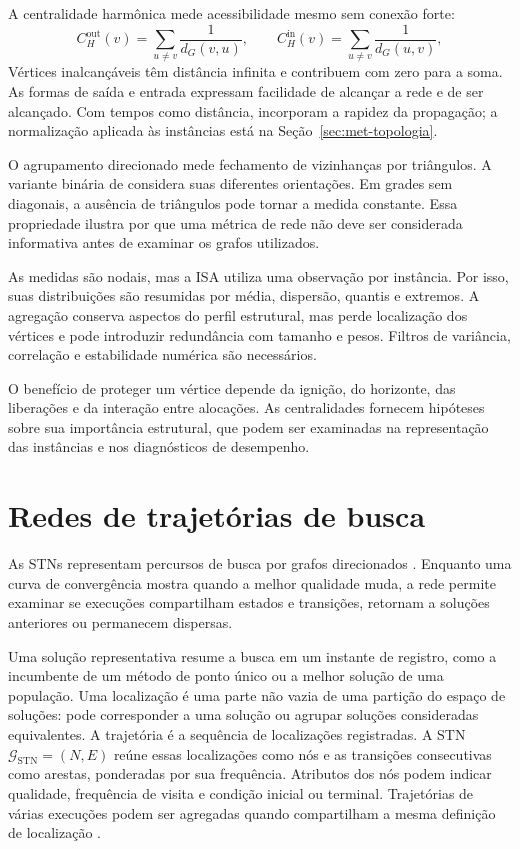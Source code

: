 A centralidade harmônica mede acessibilidade mesmo sem conexão forte:
\begin{equation}
 C_H^{\mathrm{out}}(v)=\sum_{u\neq v}\frac{1}{d_G(v,u)},\qquad
 C_H^{\mathrm{in}}(v)=\sum_{u\neq v}\frac{1}{d_G(u,v)},
 \label{eq:centralidade-harmonica}
\end{equation}
\noindent Vértices inalcançáveis têm distância infinita e contribuem
com zero para a soma. As formas de saída e entrada expressam
facilidade de alcançar a rede e de ser alcançado. Com tempos como distância,
incorporam a rapidez da propagação; a normalização aplicada às instâncias
está na Seção~\ref{sec:met-topologia}.

O agrupamento direcionado mede fechamento de vizinhanças por triângulos.
A variante binária de  considera suas diferentes
orientações. Em grades sem diagonais, a ausência de triângulos pode tornar
a medida constante. Essa propriedade ilustra por que uma métrica de rede
não deve ser considerada informativa antes de examinar os grafos utilizados.

As medidas são nodais, mas a ISA utiliza uma observação por instância.
Por isso, suas distribuições são resumidas por média, dispersão, quantis e
extremos. A agregação conserva aspectos do perfil estrutural, mas perde
localização dos vértices e pode introduzir redundância com tamanho e pesos.
Filtros de variância, correlação e estabilidade numérica são necessários.

O benefício de proteger um vértice depende da ignição, do horizonte, das
liberações e da interação entre alocações. As centralidades fornecem
hipóteses sobre sua importância estrutural, que podem ser examinadas
na representação das instâncias e nos diagnósticos de desempenho.

\section{Redes de trajetórias de busca}\label{sec:stn}

As STNs representam percursos de busca por grafos direcionados
\cite{OchoaMalanBlum2021}. Enquanto uma curva de convergência mostra quando
a melhor qualidade muda, a rede permite examinar se execuções compartilham
estados e transições, retornam a soluções anteriores ou permanecem dispersas.

Uma solução representativa resume a busca em um instante de registro,
como a incumbente de um método de ponto único ou a melhor solução de uma
população. Uma localização é uma parte não vazia de uma partição do espaço
de soluções: pode corresponder a uma solução ou agrupar soluções consideradas
equivalentes. A trajetória é a sequência de localizações registradas.
A STN $\mathcal{G}_{\mathrm{STN}}=(N,E)$ reúne essas localizações como nós
e as transições consecutivas como arestas, ponderadas por sua frequência.
Atributos dos nós podem indicar qualidade, frequência de visita e condição
inicial ou terminal. Trajetórias de várias execuções podem ser agregadas
quando compartilham a mesma definição de localização
\cite{ChaconSartoriEtAl2023,OchoaMalanBlum2021}.


